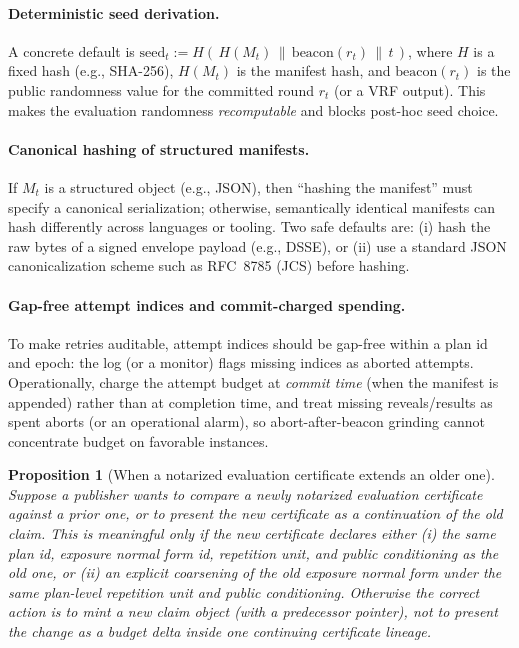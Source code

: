 \documentclass[11pt]{article}
\newtheorem{proposition}{Proposition}
\begin{document}
\paragraph{Deterministic seed derivation.}
A concrete default is
$\mathrm{seed}_t := H(\,H(M_t)\,\|\,\mathrm{beacon}(r_t)\,\|\,t\,)$,
where $H$ is a fixed hash (e.g., SHA-256), $H(M_t)$ is the manifest hash, and $\mathrm{beacon}(r_t)$ is the public randomness value for the committed round $r_t$ (or a VRF output).
This makes the evaluation randomness \emph{recomputable} and blocks post-hoc seed choice.

\paragraph{Canonical hashing of structured manifests.}
If $M_t$ is a structured object (e.g., JSON), then ``hashing the manifest'' must specify a canonical serialization;
otherwise, semantically identical manifests can hash differently across languages or tooling.
Two safe defaults are: (i) hash the raw bytes of a signed envelope payload (e.g., DSSE), or (ii) use a standard JSON canonicalization scheme such as RFC~8785 (JCS) before hashing.\cite{rfc8785}



\paragraph{Gap-free attempt indices and commit-charged spending.}
To make retries auditable, attempt indices should be gap-free within a plan id and epoch: the log (or a monitor) flags missing indices as aborted attempts.
Operationally, charge the attempt budget at \emph{commit time} (when the manifest is appended) rather than at completion time, and treat missing reveals/results as spent aborts (or an operational alarm), so abort-after-beacon grinding cannot concentrate budget on favorable instances.

\begin{proposition}[When a notarized evaluation certificate extends an older one]
\label{prop:notary-lineage}
Suppose a publisher wants to compare a newly notarized evaluation certificate against a prior one, or to present the new certificate as a continuation of the old claim.
This is meaningful only if the new certificate declares either
(i) the same plan id, exposure normal form id, repetition unit, and public conditioning as the old one, or
(ii) an explicit coarsening of the old exposure normal form under the same plan-level repetition unit and public conditioning.
Otherwise the correct action is to mint a new claim object (with a predecessor pointer), not to present the change as a budget delta inside one continuing certificate lineage.
\end{proposition}
\end{document}
